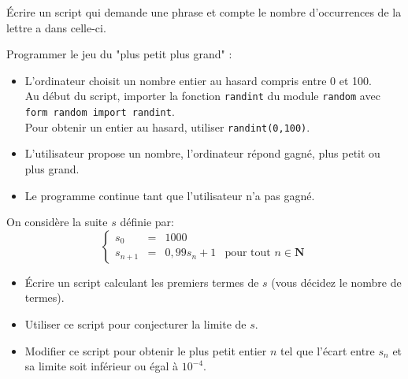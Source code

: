 \begin{exercice}
    \'Ecrire un script qui demande une phrase et compte le nombre d'occurrences de la lettre \og a \fg{} dans celle-ci.
\end{exercice}

\begin{exercice}
    Programmer le jeu du "plus petit plus grand" :
    \begin{itemize}
        \item   L'ordinateur choisit un nombre entier au hasard compris entre 0 et 100.\\
        Au début du script, importer la fonction \texttt{randint} du module \texttt{random} avec \texttt{form random import randint}.\\
        Pour obtenir un entier au hasard, utiliser \texttt{randint(0,100)}.
        \item   L'utilisateur propose un nombre, l'ordinateur répond \og gagné\fg, \og plus petit\fg{} ou \og plus grand\fg.
        \item   Le programme continue tant que l'utilisateur n'a pas gagné.
    \end{itemize}
\end{exercice}

\begin{exercice}
    On considère la suite $s$ définie par:
    $$\left\{
    \begin{array}{llll}
    s_0 & = & 1000 & \\
    s_{n+1} & = & 0,99s_n+1 & \textrm{pour tout } n\in\mathbf{N}
    \end{array}
    \right. $$
    
    \begin{itemize}
        \item   \'Ecrire un script calculant les premiers termes de $s$ (vous décidez le nombre de termes).
        \item   Utiliser ce script pour conjecturer la limite de $s$.
        \item   Modifier ce script pour obtenir le plus petit entier $n$ tel que l'écart entre $s_n$ et sa limite soit inférieur ou égal à $10^{-4}$.
        
    \end{itemize}
\end{exercice}

